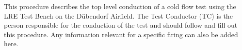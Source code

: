 This procedure describes the top level conduction of a cold flow test using the LRE Test Bench on the Dübendorf Airfield. The Test Conductor (TC) is the person responsible for the conduction of the test and should follow and fill out this procedure.
Any information relevant for a specific firing can also be added here.
